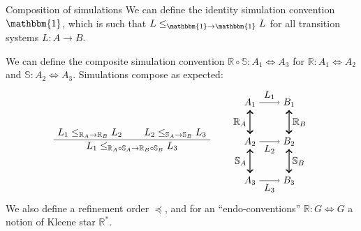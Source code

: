 \documentclass{beamer}
\begin{document}
\begin{frame}{Composition of simulations} %
We can define the identity simulation convention $\mathbbm{1}$,
which is such that $L \le_{\mathbbm{1} \rightarrow \mathbbm{1}} L$
for all transition systems $L : A \rightarrow B$.

\vspace{1ex}
We can define the composite simulation convention
$\mathbb{R} \circ \mathbb{S} : A_1 \Leftrightarrow A_3$ for
$\mathbb{R} : A_1 \Leftrightarrow A_2$ and
$\mathbb{S} : A_2 \Leftrightarrow A_3$.
Simulations compose as expected:
\vspace{-1.5em}
\[
  \AxiomC{$L_1 \le_{\mathbb{R}_A \rightarrow \mathbb{R}_B} L_2$}
  \AxiomC{$L_2 \le_{\mathbb{S}_A \rightarrow \mathbb{S}_B} L_3$}
  \BinaryInfC{$L_1 \le_{\mathbb{R}_A \circ \mathbb{S}_A \rightarrow \mathbb{R}_B \circ \mathbb{S}_B} L_3$}
  \DisplayProof
  \qquad
  \begin{tikzpicture}[baseline,scale=0.7]
    \node (A1) at (-1,  2) {$A_1$};
    \node (A2) at (-1,  0) {$A_2$};
    \node (A3) at (-1, -2) {$A_3$};
    \node (B1) at ( 1,  2) {$B_1$};
    \node (B2) at ( 1,  0) {$B_2$};
    \node (B3) at ( 1, -2) {$B_3$};
    \draw (A1) edge[->] node[auto] {$L_1$} (B1);
    \draw (A2) edge[->] node[auto,swap] {$L_2$} (B2);
    \draw (A3) edge[->] node[auto,swap] {$L_3$} (B3);
    \draw (A1) edge[<->, double] node[auto,swap] {$\mathbb{R}_A$} (A2);
    \draw (B1) edge[<->, double] node[auto] {$\mathbb{R}_B$} (B2);
    \draw (A2) edge[<->, double] node[auto,swap] {$\mathbb{S}_A$} (A3);
    \draw (B2) edge[<->, double] node[auto] {$\mathbb{S}_B$} (B3);
  \end{tikzpicture}
\]
We also define a refinement order $\preceq$,
and for an ``endo-conventions'' $\mathbb{R} : G \Leftrightarrow G$
a notion of Kleene star $\mathbb{R}^*$.
\end{frame}
\end{document}
